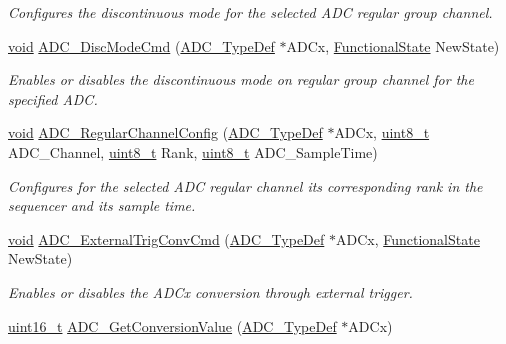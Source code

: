 \begin{DoxyCompactItemize}
\begin{DoxyCompactList}\small\item\em Configures the discontinuous mode for the selected A\+DC regular group channel. \end{DoxyCompactList}\item 
\hyperlink{usb__devapi_8h_afabf60e7f57651d6d595a02c75f07cd0}{void} \hyperlink{group___a_d_c___private___functions_ga1909649d10253ce88d986ffbb94a4be6}{A\+D\+C\+\_\+\+Disc\+Mode\+Cmd} (\hyperlink{struct_a_d_c___type_def}{A\+D\+C\+\_\+\+Type\+Def} $\ast$A\+D\+Cx, \hyperlink{agilefox_2library_2inc_2stm32f10x__type_8h_ac9a7e9a35d2513ec15c3b537aaa4fba1}{Functional\+State} New\+State)
\begin{DoxyCompactList}\small\item\em Enables or disables the discontinuous mode on regular group channel for the specified A\+DC. \end{DoxyCompactList}\item 
\hyperlink{usb__devapi_8h_afabf60e7f57651d6d595a02c75f07cd0}{void} \hyperlink{group___a_d_c___private___functions_gac531adb577b648d4bb8881f2ed627d52}{A\+D\+C\+\_\+\+Regular\+Channel\+Config} (\hyperlink{struct_a_d_c___type_def}{A\+D\+C\+\_\+\+Type\+Def} $\ast$A\+D\+Cx, \hyperlink{_p_e___types_8h_aba7bc1797add20fe3efdf37ced1182c5}{uint8\+\_\+t} A\+D\+C\+\_\+\+Channel, \hyperlink{_p_e___types_8h_aba7bc1797add20fe3efdf37ced1182c5}{uint8\+\_\+t} Rank, \hyperlink{_p_e___types_8h_aba7bc1797add20fe3efdf37ced1182c5}{uint8\+\_\+t} A\+D\+C\+\_\+\+Sample\+Time)
\begin{DoxyCompactList}\small\item\em Configures for the selected A\+DC regular channel its corresponding rank in the sequencer and its sample time. \end{DoxyCompactList}\item 
\hyperlink{usb__devapi_8h_afabf60e7f57651d6d595a02c75f07cd0}{void} \hyperlink{group___a_d_c___private___functions_ga3ae92d7940a16c898223374a5857f509}{A\+D\+C\+\_\+\+External\+Trig\+Conv\+Cmd} (\hyperlink{struct_a_d_c___type_def}{A\+D\+C\+\_\+\+Type\+Def} $\ast$A\+D\+Cx, \hyperlink{agilefox_2library_2inc_2stm32f10x__type_8h_ac9a7e9a35d2513ec15c3b537aaa4fba1}{Functional\+State} New\+State)
\begin{DoxyCompactList}\small\item\em Enables or disables the A\+D\+Cx conversion through external trigger. \end{DoxyCompactList}\item 
\hyperlink{_p_e___types_8h_a1f1825b69244eb3ad2c7165ddc99c956}{uint16\+\_\+t} \hyperlink{group___a_d_c___private___functions_gaaf74221c285ec5dab5e66baf7bec6bd3}{A\+D\+C\+\_\+\+Get\+Conversion\+Value} (\hyperlink{struct_a_d_c___type_def}{A\+D\+C\+\_\+\+Type\+Def} $\ast$A\+D\+Cx)

\end{DoxyCompactItemize}
